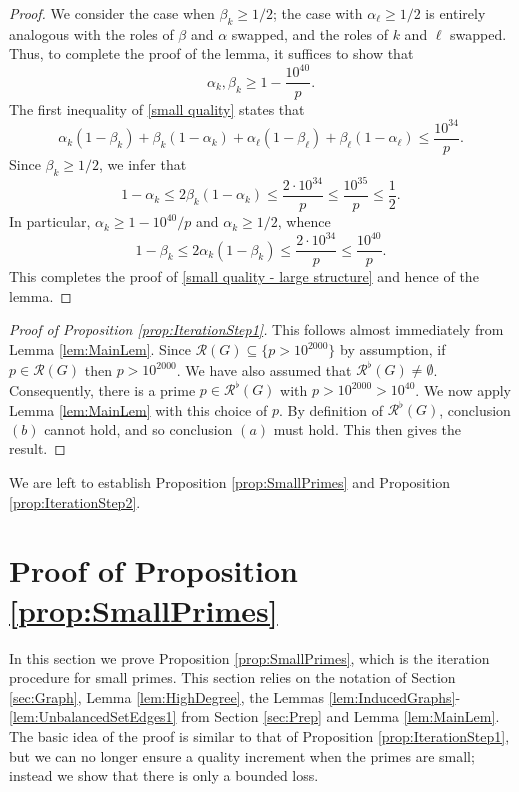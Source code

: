 \documentclass[12pt]{amsart}
\numberwithin{equation}{section}
\theoremstyle{definition}
\theoremstyle{remark}
\newcommand{\CR}{\mathcal{R}}
\renewcommand{\le}{\leqslant}
\renewcommand{\ge}{\geqslant}
\begin{document}
\begin{proof}
We consider the case when $\beta_k\ge1/2$; the case with $\alpha_\ell\ge 1/2$ is entirely analogous with the roles of $\beta$ and $\alpha$ swapped, and the roles of $k$ and $\ell$ swapped. Thus, to complete the proof of the lemma, it suffices to show that
\begin{equation}\label{small quality - large structure}
\alpha_k,\beta_k
	\ge1-\frac{10^{40}}{p}.
\end{equation}
The first inequality of \eqref{small quality} states that
\[
\alpha_k(1-\beta_k)
+\beta_k(1-\alpha_k)
+\alpha_\ell(1-\beta_\ell)
+\beta_\ell(1-\alpha_\ell)
	\le \frac{10^{34}}{p}.
\]
Since $\beta_k\ge1/2$, we infer that
\[
1-\alpha_k\le 2\beta_k(1-\alpha_k)\le 
	\frac{2\cdot 10^{34}}{p}\le \frac{10^{35}}{p} \le \frac{1}{2}. 
\]
In particular, $\alpha_k\ge 1-10^{40}/p$ and $\alpha_k\ge1/2$, whence
\[
1-\beta_k\le 2\alpha_k(1-\beta_k)\le 
\frac{2\cdot 10^{34}}{p}\le \frac{10^{40}}{p}.
\]
This completes the proof of \eqref{small quality - large structure} and hence of the lemma.
\end{proof}







\begin{proof}[Proof of Proposition \ref{prop:IterationStep1}]
This follows almost immediately from Lemma \ref{lem:MainLem}. Since $\CR(G)\subseteq\{p>10^{2000}\}$ by assumption, if $p\in\CR(G)$ then $p>10^{2000}$. We have also assumed that $\CR^{\flat}(G)\ne\emptyset$. Consequently, there is a prime $p\in\CR^\flat(G)$ with $p>10^{2000}>10^{40}$. We now apply Lemma \ref{lem:MainLem} with this choice of $p$. By definition of $\CR^\flat(G)$, conclusion $(b)$ cannot hold, and so conclusion $(a)$ must hold. This then gives the result.
\end{proof}


We are left to establish Proposition \ref{prop:SmallPrimes} and Proposition \ref{prop:IterationStep2}.

\section{Proof of Proposition \ref{prop:SmallPrimes}}\label{sec:SmallPrime}


In this section we prove Proposition \ref{prop:SmallPrimes}, which is the iteration procedure for small primes. This section relies on the notation of Section \ref{sec:Graph}, Lemma \ref{lem:HighDegree}, the Lemmas \ref{lem:InducedGraphs}-\ref{lem:UnbalancedSetEdges1} from Section \ref{sec:Prep} and Lemma \ref{lem:MainLem}. The basic idea of the proof is similar to that of Proposition \ref{prop:IterationStep1}, but we can no longer ensure a quality increment when the primes are small; instead we show that there is only a bounded loss.
\end{document}
